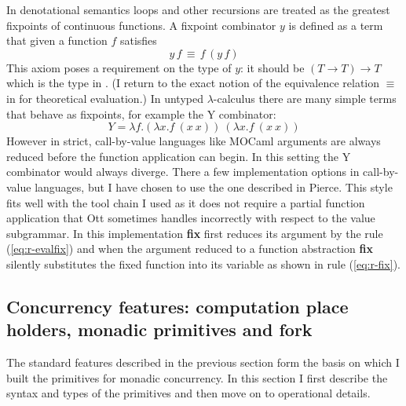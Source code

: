 \documentclass[12pt,twoside,notitlepage]{report}
\theoremstyle{plain}%
\theoremstyle{definition}
\theoremstyle{remark}
\begin{document}
In denotational semantics loops and other recursions are treated as the greatest fixpoints of continuous functions. A fixpoint combinator $ y $ is defined as a term that given a function $ f $ satisfies
\[ y\,f\,\equiv\, f\,(y\,f) \] 
This axiom poses a requirement on the type of $ y $: it should be $ (T \rightarrow T) \rightarrow T $ which is the type in . (I return to the exact notion of the equivalence relation $ \equiv $ in  for theoretical evaluation.)
In untyped $ \lambda $-calculus there are many simple terms that behave as fixpoints, for example the Y combinator:
\[ Y = \lambda f.(\lambda x.f\ (x\ x))\ (\lambda x.f\ (x\ x))  \]
However in strict, call-by-value languages like MOCaml arguments are always reduced before the function application can begin. In this setting the Y combinator would always diverge. There a few implementation options in call-by-value languages, but I have chosen to use the one described in Pierce\cite[p.~144]{pierce2002types}. This style fits well with the tool chain I used as it does not require a partial function application that Ott sometimes handles incorrectly with respect to the value subgrammar. In this implementation \textbf{fix} first reduces its argument by the rule (\ref{eq:r-evalfix}) and when the argument reduced to a function abstraction \textbf{fix} silently substitutes the fixed function into its variable as shown in rule (\ref{eq:r-fix}).
\clearpage

\subsection{Concurrency features: computation place holders, monadic primitives and fork}
The standard features described in the previous section form the basis on which I built the primitives for monadic concurrency. In this section I first describe the syntax and types of the primitives and then move on to operational details.
\end{document}
